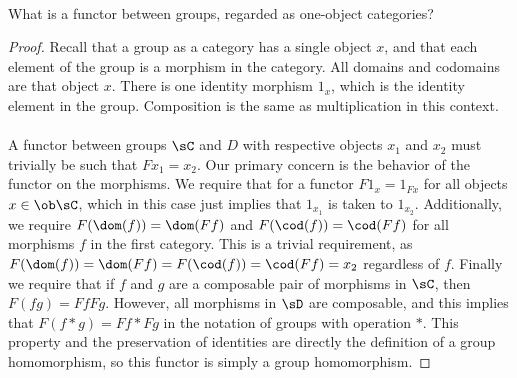 \documentclass[main.tex]{subfiles}
\begin{document}
\paragraph{}
\begin{exercise}
	What is a functor between groups, regarded as one-object categories?
\end{exercise}

\begin{proof}
	Recall that a group as a category has a single object \(x\), and that each
	element of the group is a morphism in the category.  All domains and
	codomains are that object \(x\).  There is one identity morphism \(1_x\),
	which is the identity element in the group.  Composition is the same as
	multiplication in this context. \\ \\ A functor between groups \(\sC\) and
	\(D\) with respective objects \(x_1\) and \(x_2\) must trivially be such
	that \(Fx_1 = x_2\).  Our primary concern is the behavior of the functor
	on the morphisms. We require that for a functor \(F1_x = 1_{Fx}\) for
	all objects \(x \in \ob\sC\), which in this case just implies that \(1_{x_1}\)
	is taken to \(1_{x_2}\).  Additionally, we require \(F(\dom(f)) =
	\dom(Ff)\) and \(F(\cod(f)) = \cod(Ff)\) for all morphisms \(f\) in the
	first category.  This is a trivial requirement, as \(F(\dom(f)) = \dom(Ff)
	= F(\cod(f))= \cod(Ff) = x_2\) regardless of \(f\).  Finally we require
	that if \(f\) and \(g\) are a composable pair of morphisms in \(\sC\), then
	\(F(fg) = FfFg\). However, all morphisms in \(\sD\) are composable, and
	this implies that \(F(f*g) = Ff*Fg\) in the notation of groups with
	operation \(*\).  This property and the preservation of identities are
	directly the definition of a group homomorphism, so this functor is simply a
	group homomorphism.
\end{proof}
\end{document}
